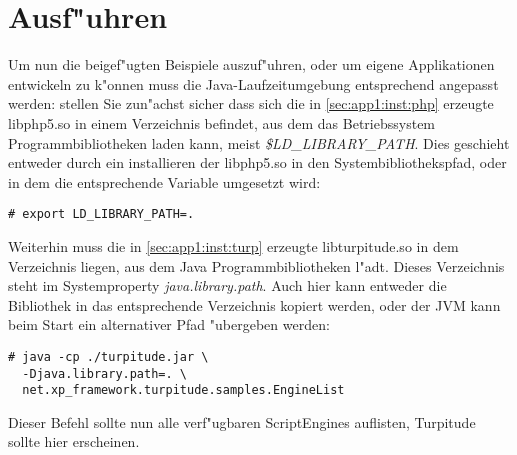 \section{Ausf"uhren}
\label{sec:app1:exec}

Um nun die beigef"ugten Beispiele auszuf"uhren, oder um eigene Applikationen entwickeln zu 
k"onnen muss die Java-Laufzeitumgebung entsprechend angepasst werden:
stellen Sie zun"achst sicher dass sich die in \ref{sec:app1:inst:php} erzeugte libphp5.so in
einem Verzeichnis befindet, aus dem das Betriebssystem Programmbibliotheken laden kann,
meist \emph{\$LD\_LIBRARY\_PATH}. Dies geschieht entweder durch ein installieren der libphp5.so
in den Systembibliothekspfad, oder in dem die entsprechende Variable umgesetzt wird:

\begin{lstlisting}[caption=Anpassen des Makefiles]
# export LD_LIBRARY_PATH=.
\end{lstlisting}

Weiterhin muss die in \ref{sec:app1:inst:turp} erzeugte libturpitude.so in dem Verzeichnis liegen,
aus dem Java Programmbibliotheken l"adt. Dieses Verzeichnis steht im Systemproperty \emph{java.library.path}.
Auch hier kann entweder die Bibliothek in das entsprechende Verzeichnis kopiert werden, oder 
der JVM kann beim Start ein alternativer Pfad "ubergeben werden:

\begin{lstlisting}[caption=Ausf"uhren eines Turpitude-Programmes]
# java -cp ./turpitude.jar \
  -Djava.library.path=. \
  net.xp_framework.turpitude.samples.EngineList
\end{lstlisting}

Dieser Befehl sollte nun alle verf"ugbaren ScriptEngines auflisten, Turpitude sollte hier erscheinen.



